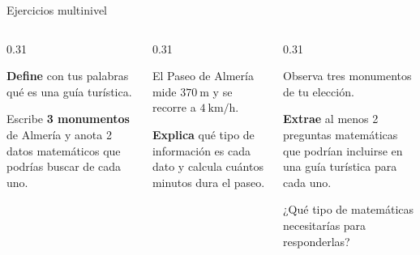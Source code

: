 \documentclass[aspectratio=169, 10pt, spanish]{beamer}
\begin{document}
\begin{frame}{Ejercicios multinivel}
  \begin{columns}[T]
    \begin{column}{0.31\textwidth}
      \begin{recordarbox}
        
        \textbf{Define} con tus palabras qué es
        una guía turística.\par
        Escribe \textbf{3 monumentos} de Almería
        y anota 2 datos matemáticos que podrías
        buscar de cada uno.
      \end{recordarbox}
    \end{column}
    \begin{column}{0.31\textwidth}
      \begin{comprenderbox}
        
        El Paseo de Almería mide $370\ \text{m}$
        y se recorre a $4\ \text{km/h}$.\par
        \textbf{Explica} qué tipo de información es
        cada dato y calcula cuántos minutos dura
        el paseo.
      \end{comprenderbox}
    \end{column}
    \begin{column}{0.31\textwidth}
      \begin{analizarbox}
        
        Observa tres monumentos de tu elección.\par
        \textbf{Extrae} al menos 2 preguntas
        matemáticas que podrían incluirse en
        una guía turística para cada uno.\par
        ¿Qué tipo de matemáticas necesitarías
        para responderlas?
      \end{analizarbox}
    \end{column}
  \end{columns}
\end{frame}
\end{document}
